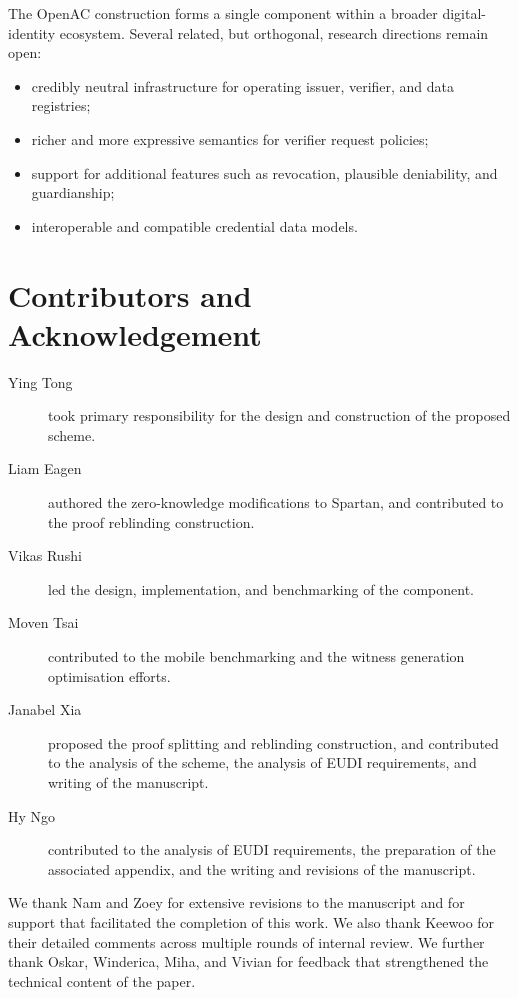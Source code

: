 \documentclass{article}
\begin{document}
The OpenAC construction forms a single component within a broader digital-identity ecosystem. Several 
related, but orthogonal, research directions remain open:
\begin{itemize}
    \item credibly neutral infrastructure for operating issuer, verifier, and data registries;
    \item richer and more expressive semantics for verifier request policies;
    \item support for additional features such as revocation, plausible deniability, and guardianship;
    \item interoperable and compatible credential data models.
\end{itemize}



\clearpage
\section*{Contributors and Acknowledgement}
\begin{description}
	\item[Ying Tong] took primary responsibility for the design and construction of the proposed scheme.
    \item[Liam Eagen] authored the zero-knowledge modifications to Spartan, and contributed to the proof reblinding construction.
    \item[Vikas Rushi] led the design, implementation, and benchmarking of the component.
    \item[Moven Tsai] contributed to the mobile benchmarking and the witness generation optimisation efforts.
    \item[Janabel Xia] proposed the proof splitting and reblinding construction, and contributed to the analysis of the scheme, the analysis of EUDI requirements, and writing of the manuscript.
	\item[Hy Ngo] contributed to the analysis of EUDI requirements, the preparation of the associated appendix, and the writing and revisions of the manuscript.
\end{description}

We thank Nam and Zoey for extensive revisions to the manuscript and for support that facilitated the completion of this work.
We also thank Keewoo for their detailed comments across multiple rounds of internal review.
We further thank Oskar, Winderica, Miha, and Vivian for feedback that strengthened the technical content of the paper.
\end{document}
